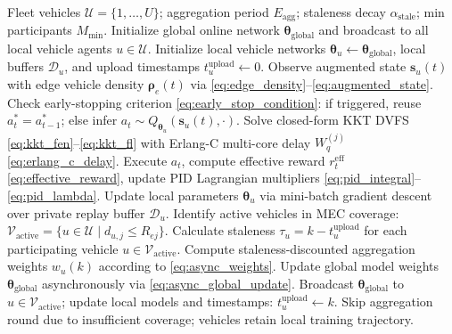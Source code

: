 \documentclass[12pt,a4paper]{article}
\begin{document}
\begin{algorithm}[htbp]
\caption{Asynchronous Federated Constrained Safe DRL (AF-CDRL) for Vehicular Fleets}
\label{alg:af_cdrl}
\begin{algorithmic}[1]
\Require Fleet vehicles $\mathcal{U} = \{1,\dots,U\}$; aggregation period $E_{\mathrm{agg}}$; staleness decay $\alpha_{\mathrm{stale}}$; min participants $M_{\min}$.
\State Initialize global online network $\boldsymbol{\theta}_{\mathrm{global}}$ and broadcast to all local vehicle agents $u \in \mathcal{U}$.
\State Initialize local vehicle networks $\boldsymbol{\theta}_u \leftarrow \boldsymbol{\theta}_{\mathrm{global}}$, local buffers $\mathcal{D}_u$, and upload timestamps $t_u^{\mathrm{upload}} \leftarrow 0$.
        \State Observe augmented state $\mathbf{s}_u(t)$ with edge vehicle density $\boldsymbol{\rho}_e(t)$ via \eqref{eq:edge_density}--\eqref{eq:augmented_state}.
        \State Check early-stopping criterion \eqref{eq:early_stop_condition}: if triggered, reuse $a_t^* = a_{t-1}^*$; else infer $a_t \sim Q_{\boldsymbol{\theta}_u}(\mathbf{s}_u(t), \cdot)$.
        \State Solve closed-form KKT DVFS \eqref{eq:kkt_fen}--\eqref{eq:kkt_fl} with Erlang-C multi-core delay $W_q^{(j)}$ \eqref{eq:erlang_c_delay}.
        \State Execute $a_t$, compute effective reward $r_t^{\mathrm{eff}}$ \eqref{eq:effective_reward}, update PID Lagrangian multipliers \eqref{eq:pid_integral}--\eqref{eq:pid_lambda}.
        \State Update local parameters $\boldsymbol{\theta}_u$ via mini-batch gradient descent over private replay buffer $\mathcal{D}_u$.
    \EndFor
        \State Identify active vehicles in MEC coverage: $\mathcal{V}_{\mathrm{active}} = \{ u \in \mathcal{U} \mid d_{u,j} \le R_{ej} \}$.
            \State Calculate staleness $\tau_u = k - t_u^{\mathrm{upload}}$ for each participating vehicle $u \in \mathcal{V}_{\mathrm{active}}$.
            \State Compute staleness-discounted aggregation weights $w_u(k)$ according to \eqref{eq:async_weights}.
            \State Update global model weights $\boldsymbol{\theta}_{\mathrm{global}}$ asynchronously via \eqref{eq:async_global_update}.
            \State Broadcast $\boldsymbol{\theta}_{\mathrm{global}}$ to $u \in \mathcal{V}_{\mathrm{active}}$; update local models and timestamps: $t_u^{\mathrm{upload}} \leftarrow k$.
        \Else
            \State Skip aggregation round due to insufficient coverage; vehicles retain local training trajectory.
        \EndIf
    \EndIf
\EndFor
\end{algorithmic}
\end{algorithm}
\end{document}

